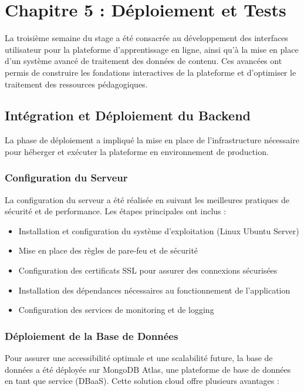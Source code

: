 \chapter{Chapitre 5 : Déploiement et Tests}
\thispagestyle{fancy}
\newpage

La troisième semaine du stage a été consacrée au développement des interfaces utilisateur pour la plateforme d'apprentissage en ligne, ainsi qu'à la mise en place d'un système avancé de traitement des données de contenu. Ces avancées ont permis de construire les fondations interactives de la plateforme et d'optimiser le traitement des ressources pédagogiques.

\section{Intégration et Déploiement du Backend}

La phase de déploiement a impliqué la mise en place de l'infrastructure nécessaire pour héberger et exécuter la plateforme en environnement de production.

\subsection{Configuration du Serveur}

La configuration du serveur a été réalisée en suivant les meilleures pratiques de sécurité et de performance. Les étapes principales ont inclus :

\begin{itemize}
  \item Installation et configuration du système d'exploitation (Linux Ubuntu Server)
  \item Mise en place des règles de pare-feu et de sécurité
  \item Configuration des certificats SSL pour assurer des connexions sécurisées
  \item Installation des dépendances nécessaires au fonctionnement de l'application
  \item Configuration des services de monitoring et de logging
\end{itemize}

\subsection{Déploiement de la Base de Données}

Pour assurer une accessibilité optimale et une scalabilité future, la base de données a été déployée sur MongoDB Atlas, une plateforme de base de données en tant que service (DBaaS). Cette solution cloud offre plusieurs avantages :

